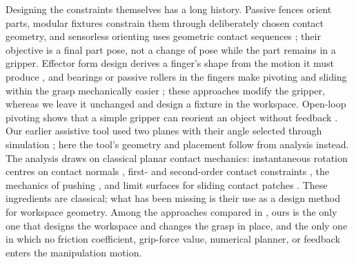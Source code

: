 \label{sec:related}
Designing the constraints themselves has a long history. Passive fences orient parts, modular fixtures constrain them through deliberately chosen contact geometry, and sensorless orienting uses geometric contact sequences \cite{wiegley1997complete,brost1996complete,goldberg1993orienting,asada1985fixturing}; their objective is a final part pose, not a change of pose while the part remains in a gripper. Effector form design derives a finger's shape from the motion it must produce \cite{rodriguez2013effector}, and bearings or passive rollers in the fingers make pivoting and sliding within the grasp mechanically easier \cite{carlisle1994pivoting,fisk2026rollers}; these approaches modify the gripper, whereas we leave it unchanged and design a fixture in the workspace. Open-loop pivoting shows that a simple gripper can reorient an object without feedback \cite{holladay2015general,cruciani2017hand}. Our earlier assistive tool used two planes with their angle selected through simulation \cite{bolduc2023inhand}; here the tool's geometry and placement follow from analysis instead. The analysis draws on classical planar contact mechanics: instantaneous rotation centres on contact normals \cite{mason2001mechanics}, first- and second-order contact constraints \cite{ohwovoriole1981extension,rimon1998mobility}, the mechanics of pushing \cite{mason1986mechanics,peshkin1988planning,lynch1996stable}, and limit surfaces for sliding contact patches \cite{goyal1991planar,howe1996practical,xydas1999modeling}. These ingredients are classical; what has been missing is their use as a design method for workspace geometry. Among the approaches compared in , ours is the only one that designs the workspace and changes the grasp in place, and the only one in which no friction coefficient, grip-force value, numerical planner, or feedback enters the manipulation motion.


